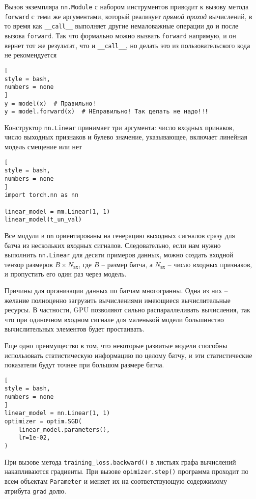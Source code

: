 \documentclass[%
	11pt,
	a4paper,
	utf8,
		]{article}
\begin{document}
Вызов экземпляра \verb|nn.Module| с набором инструментов приводит к вызову метода \verb|forward| с теми же аргументами, который реализует \emph{прямой проход} вычислений, в то время как \verb|__call__| выполняет другие немаловажные операции до и после вызова \verb|forward|. {\color{red} Так что формально можно вызвать \verb|forward| напрямую, и он вернет тот же результат, что и \verb|__call__|, но делать это из пользовательского кода не рекомендуется}
\begin{lstlisting}[
style = bash,
numbers = none
]
y = model(x)  # Правильно!
y = model.forward(x)  # НЕправильно! Так делать не надо!!!
\end{lstlisting}

Конструктор \verb|nn.Linear| принимает три аргумента: число входных принаков, число выходных признаков и булево значение, указывающее, включает линейная модель смещение или нет
\begin{lstlisting}[
style = bash,
numbers = none
]
import torch.nn as nn

linear_model = mm.Linear(1, 1)
linear_model(t_un_val)
\end{lstlisting}

Все модули в \verb|nn| ориентированы на генерацию выходных сигналов сразу для батча из нескольких входных сигналов. Следовательно, если нам нужно выполнить \verb|nn.Linear| для десяти примеров данных, можно создать входной тензор размеров $B \times N_{\text{вх}}$, где $B$ -- размер батча, а $N_{\text{вх}}$ -- число входных признаков, и пропустить его один раз через модель.

Причины для организации данных по батчам многогранны. Одна из них -- желание полноценно загрузить вычислениями имеющиеся вычислительные ресурсы. В частности, GPU позволяют сильно распараллеливать вычисления, так что при одиночном входном сигнале для маленькой модели большинство вычислительных элементов будет простаивать.

Еще одно преимущество в том, что некоторые развитые модели способны использовать статистическую информацию по целому батчу, и эти статистические показатели будут точнее при большом размере батча.

\begin{lstlisting}[
style = bash,
numbers = none
]
linear_model = nn.Linear(1, 1)
optimizer = optim.SGD(
    linear_model.parameters(),
    lr=1e-02,
)
\end{lstlisting}

При вызове метода \verb|training_loss.backward()| в листьях графа вычислений накапливаются градиенты. При вызове \verb|opimizer.step()| программа проходит по всем объектам \verb|Parameter| и меняет их на соответствующую содержимому атрибута \verb|grad| долю. 
\end{document}
